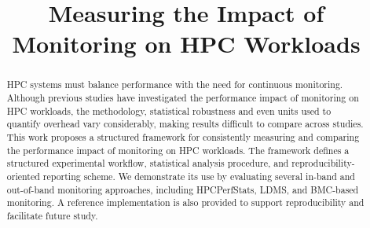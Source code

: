 \documentclass[conference]{IEEEtran}
\begin{document}




\title{Measuring the Impact of Monitoring on HPC Workloads}

\author{
}

\maketitle


\begin{abstract}
HPC systems must balance performance with the need for continuous monitoring. Although previous studies have investigated the performance impact of monitoring on HPC workloads, the methodology, statistical robustness and even units used to quantify overhead vary considerably, making results difficult to compare across studies. This work proposes a structured framework for consistently measuring and comparing the performance impact of monitoring on HPC workloads. The framework defines a structured experimental workflow, statistical analysis procedure, and reproducibility-oriented reporting scheme. We demonstrate its use by evaluating several in-band and out-of-band monitoring approaches, including HPCPerfStats, LDMS, and BMC-based monitoring. A reference implementation is also provided to support reproducibility and facilitate future study.
\end{abstract}
\end{document}
